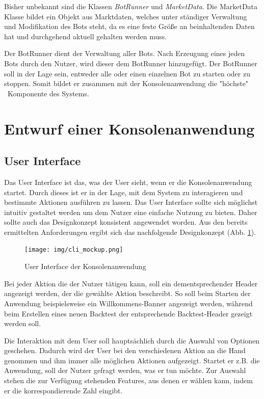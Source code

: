 \documentclass[oneside]{ausarbeitung}
\begin{document}
Bisher unbekannt sind die Klassen \textit{BotRunner} und \textit{MarketData}. Die MarketData Klasse bildet ein Objekt aus Marktdaten, welches unter ständiger Verwaltung und Modifikation des Bots steht, da es eine feste Größe an beinhaltenden Daten hat und durchgehend aktuell gehalten werden muss.

Der BotRunner dient der Verwaltung aller Bots. Nach Erzeugung eines jeden Bots durch den Nutzer, wird dieser dem BotRunner hinzugefügt. Der BotRunner soll in der Lage sein, entweder alle oder einen einzelnen Bot zu starten oder zu stoppen. Somit bildet er zusammen mit der Konsolenanwendung die "höchste" \ Komponente des Systems.


\section{Entwurf einer Konsolenanwendung}
\label{sec:entwurf_einer_konsolenanwendung}

\subsection{User Interface}
\label{sub:user_interface}

Das User Interface ist das, was der User sieht, wenn er die Konsolenanwendung startet. Durch dieses ist er in der Lage, mit dem System zu interagieren und bestimmte Aktionen ausführen zu lassen. Das User Interface sollte sich möglichst intuitiv gestaltet werden um dem Nutzer eine einfache Nutzung zu bieten. Daher sollte auch das Designkonzept konsistent angewendet worden. Aus den bereits ermittelten Anforderungen ergibt sich das nachfolgende Designkonzept (Abb. \ref{fig:15}).

\begin{figure}[H]
  \centering
  \texttt{[image: img/cli\_mockup.png]}
  \caption{User Interface der Konsolenanwendung}
  \label{fig:15}
\end{figure}

Bei jeder Aktion die der Nutzer tätigen kann, soll ein dementsprechender Header angezeigt werden, der die gewählte Aktion beschreibt. So soll beim Starten der Anwendung beispielsweise ein Willkommens-Banner angezeigt werden, während beim Erstellen eines neuen Backtest der entsprechende Backtest-Header gezeigt werden soll.

Die Interaktion mit dem User soll hauptsächlich durch die Auswahl von Optionen geschehen. Dadurch wird der User bei den verschiedenen Aktion an die Hand genommen und ihm immer alle möglichen Aktionen aufgezeigt. Startet er z.B. die Anwendung, soll der Nutzer gefragt werden, was er tun möchte. Zur Auswahl stehen die zur Verfügung stehenden Features, aus denen er wählen kann, indem er die korrespondierende Zahl eingibt.
\end{document}
